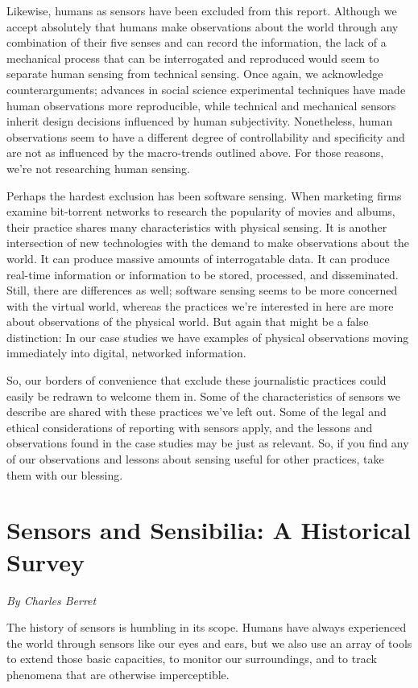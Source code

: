 Likewise, humans as sensors have been excluded from this report. Although
we accept absolutely that humans make observations about the world
through any combination of their five senses and can record the information,
the lack of a mechanical process that can be interrogated and reproduced
would seem to separate human sensing from technical sensing. Once again,
we acknowledge counterarguments; advances in social science experimental
techniques have made human observations more reproducible, while
technical and mechanical sensors inherit design decisions influenced by
human subjectivity. Nonetheless, human observations seem to have a different
degree of controllability and specificity and are not as influenced by
the macro-trends outlined above. For those reasons, we're not researching
human sensing.

Perhaps the hardest exclusion has been software sensing. When marketing
firms examine bit-torrent networks to research the popularity of movies
and albums, their practice shares many characteristics with physical sensing.
It is another intersection of new technologies with the demand to make
observations about the world. It can produce massive amounts of interrogatable
data. It can produce real-time information or information to be
stored, processed, and disseminated. Still, there are differences as well; software
sensing seems to be more concerned with the virtual world, whereas
the practices we're interested in here are more about observations of the
physical world. But again that might be a false distinction: In our case studies
we have examples of physical observations moving immediately into
digital, networked information.

So, our borders of convenience that exclude these journalistic practices
could easily be redrawn to welcome them in. Some of the characteristics of
sensors we describe are shared with these practices we've left out. Some of
the legal and ethical considerations of reporting with sensors apply, and the
lessons and observations found in the case studies may be just as relevant.
So, if you find any of our observations and lessons about sensing useful for
other practices, take them with our blessing.

\chapter{Sensors and Sensibilia: A Historical Survey}
\textit{By Charles Berret}

The history of sensors is humbling in its scope. Humans have always experienced
the world through sensors like our eyes and ears, but we also use an
array of tools to extend those basic capacities, to monitor our surroundings,
and to track phenomena that are otherwise imperceptible.

